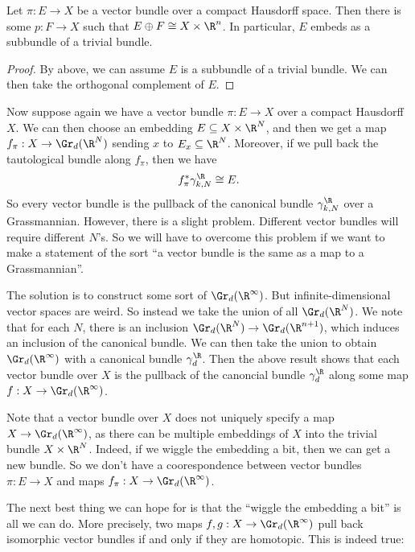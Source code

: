 \documentclass[a4paper]{article}
\begin{document}
\begin{cor}
  Let $\pi: E \to X$ be a vector bundle over a compact Hausdorff space. Then there is some $p: F \to X$ such that $E \oplus F \cong X \times \R^n$. In particular, $E$ embeds as a subbundle of a trivial bundle.
\end{cor}

\begin{proof}
  By above, we can assume $E$ is a subbundle of a trivial bundle. We can then take the orthogonal complement of $E$.
\end{proof}

Now suppose again we have a vector bundle $\pi: E\to X$ over a compact Hausdorff $X$. We can then choose an embedding $E \subseteq X \times \R^N$, and then we get a map $f_\pi: X \to \Gr_d (\R^N)$ sending $x$ to $E_x \subseteq \R^N$. Moreover, if we pull back the tautological bundle along $f_\pi$, then we have
\[
  f_{\pi}^* \gamma_{k, N}^\R \cong E.
\]
So every vector bundle is the pullback of the canonical bundle $\gamma_{k, N}^\R$ over a Grassmannian. However, there is a slight problem. Different vector bundles will require different $N$'s. So we will have to overcome this problem if we want to make a statement of the sort ``a vector bundle is the same as a map to a Grassmannian''.

The solution is to construct some sort of $\Gr_d(\R^\infty)$. But infinite-dimensional vector spaces are weird. So instead we take the union of all $\Gr_d(\R^N)$. We note that for each $N$, there is an inclusion $\Gr_d(\R^N) \to \Gr_d(\R^{n + 1})$, which induces an inclusion of the canonical bundle. We can then take the union to obtain $\Gr_d(\R^\infty)$ with a canonical bundle $\gamma_d^\R$. Then the above result shows that each vector bundle over $X$ is the pullback of the canoncial bundle $\gamma_d^\R$ along some map $f: X \to \Gr_d(\R^\infty)$.

Note that a vector bundle over $X$ does not uniquely specify a map $X \to \Gr_d(\R^\infty)$, as there can be multiple embeddings of $X$ into the trivial bundle $X \times \R^N$. Indeed, if we wiggle the embedding a bit, then we can get a new bundle. So we don't have a coorespondence between vector bundles $\pi: E \to X$ and maps $f_\pi: X \to \Gr_d(\R^\infty)$.

The next best thing we can hope for is that the ``wiggle the embedding a bit'' is all we can do. More precisely, two maps $f, g: X \to \Gr_d(\R^\infty)$ pull back isomorphic vector bundles if and only if they are homotopic. This is indeed true:
\end{document}
